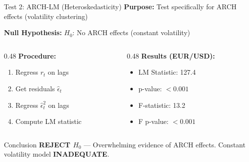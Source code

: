\documentclass[11pt,aspectratio=169]{beamer}
\begin{document}
	\begin{frame}{Test 2: ARCH-LM (Heteroskedasticity)}
		\textbf{Purpose:} Test specifically for ARCH effects (volatility clustering)
		
		\vspace{0.2cm}
		
		\textbf{Null Hypothesis:} $H_0$: No ARCH effects (constant volatility)
		
		\vspace{0.2cm}
		
		\begin{columns}[T]
			\begin{column}{0.48\textwidth}
				\textbf{Procedure:}
				\begin{enumerate}
					\item Regress $r_t$ on lags
					\item Get residuals $\hat{\epsilon}_t$
					\item Regress $\hat{\epsilon}_t^2$ on lags
					\item Compute LM statistic
				\end{enumerate}
			\end{column}
			
			\begin{column}{0.48\textwidth}
				\textbf{Results (EUR/USD):}
				\begin{itemize}
					\item LM Statistic: 127.4
					\item p-value: $< 0.001$
					\item F-statistic: 13.2
					\item F p-value: $< 0.001$
				\end{itemize}
			\end{column}
		\end{columns}
		
		\vspace{0.3cm}
		
		\begin{alertblock}{Conclusion}
			\textcolor{mufgred}{\textbf{REJECT $H_0$}} — Overwhelming evidence of ARCH effects. Constant volatility model \textbf{INADEQUATE}.
		\end{alertblock}
	\end{frame}
	
\end{document}
